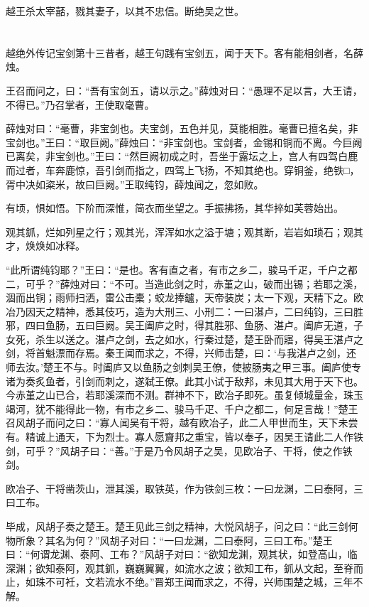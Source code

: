 \documentclass[12pt,UTF8]{ctexbook}
\begin{document}
越王杀太宰嚭，戮其妻子，以其不忠信。断绝吴之世。


\part{}

越绝外传记宝剑第十三昔者，越王句践有宝剑五，闻于天下。客有能相剑者，名薛烛。

王召而问之，曰：“吾有宝剑五，请以示之。”薛烛对曰：“愚理不足以言，大王请，不得已。”乃召掌者，王使取毫曹。

薛烛对曰：“毫曹，非宝剑也。夫宝剑，五色并见，莫能相胜。毫曹已擅名矣，非宝剑也。”王曰：“取巨阙。”薛烛曰：“非宝剑也。宝剑者，金锡和铜而不离。今巨阙已离矣，非宝剑也。”王曰：“然巨阙初成之时，吾坐于露坛之上，宫人有四驾白鹿而过者，车奔鹿惊，吾引剑而指之，四驾上飞扬，不知其绝也。穿铜釜，绝铁□，胥中决如粢米，故曰巨阙。”王取纯钧，薛烛闻之，忽如败。

有顷，惧如悟。下阶而深惟，简衣而坐望之。手振拂扬，其华捽如芙蓉始出。

观其釽，烂如列星之行；观其光，浑浑如水之溢于塘；观其断，岩岩如琐石；观其才，焕焕如冰释。

“此所谓纯钧耶？”王曰：“是也。客有直之者，有市之乡二，骏马千疋，千户之都二，可乎？”薛烛对曰：“不可。当造此剑之时，赤堇之山，破而出锡；若耶之溪，涸而出铜；雨师扫洒，雷公击橐；蛟龙捧鑪，天帝装炭；太一下观，天精下之。欧冶乃因天之精神，悉其伎巧，造为大刑三、小刑二：一曰湛卢，二曰纯钧，三曰胜邪，四曰鱼肠，五曰巨阙。吴王阖庐之时，得其胜邪、鱼肠、湛卢。阖庐无道，子女死，杀生以送之。湛卢之剑，去之如水，行秦过楚，楚王卧而寤，得吴王湛卢之剑，将首魁漂而存焉。秦王闻而求之，不得，兴师击楚，曰：‘与我湛卢之剑，还师去汝。’楚王不与。时阖庐又以鱼肠之剑刺吴王僚，使披肠夷之甲三事。阖庐使专诸为奏炙鱼者，引剑而刺之，遂弑王僚。此其小试于敌邦，未见其大用于天下也。今赤堇之山已合，若耶溪深而不测。群神不下，欧冶子即死。虽复倾城量金，珠玉竭河，犹不能得此一物，有市之乡二、骏马千疋、千户之都二，何足言哉！”楚王召风胡子而问之曰：“寡人闻吴有干将，越有欧冶子，此二人甲世而生，天下未尝有。精诚上通天，下为烈士。寡人愿齎邦之重宝，皆以奉子，因吴王请此二人作铁剑，可乎？”风胡子曰：“善。”于是乃令风胡子之吴，见欧冶子、干将，使之作铁剑。

欧冶子、干将凿茨山，泄其溪，取铁英，作为铁剑三枚：一曰龙渊，二曰泰阿，三曰工布。

毕成，风胡子奏之楚王。楚王见此三剑之精神，大悦风胡子，问之曰：“此三剑何物所象？其名为何？”风胡子对曰：“一曰龙渊，二曰泰阿，三曰工布。”楚王曰：“何谓龙渊、泰阿、工布？”风胡子对曰：“欲知龙渊，观其状，如登高山，临深渊；欲知泰阿，观其釽，巍巍翼翼，如流水之波；欲知工布，釽从文起，至脊而止，如珠不可衽，文若流水不绝。”晋郑王闻而求之，不得，兴师围楚之城，三年不解。
\end{document}
